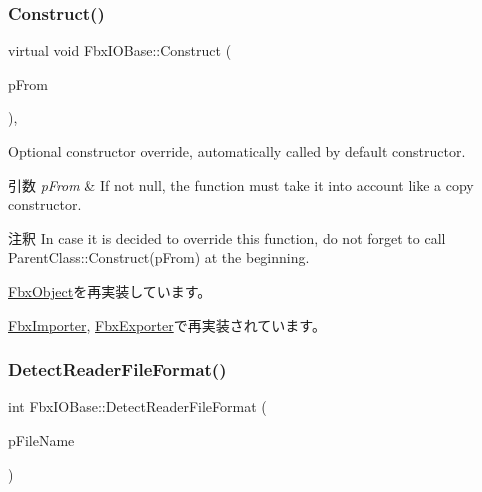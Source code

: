 \subsubsection{\texorpdfstring{Construct()}{Construct()}}
{\footnotesize\ttfamily virtual void Fbx\+I\+O\+Base\+::\+Construct (\begin{DoxyParamCaption}\item[{const \hyperlink{class_fbx_object}{Fbx\+Object} $\ast$}]{p\+From }\end{DoxyParamCaption})\hspace{0.3cm}{\ttfamily [protected]}, {\ttfamily [virtual]}}

Optional constructor override, automatically called by default constructor. 
\begin{DoxyParams}{引数}
{\em p\+From} & If not null, the function must take it into account like a copy constructor. \\
\hline
\end{DoxyParams}
\begin{DoxyRemark}{注釈}
In case it is decided to override this function, do not forget to call Parent\+Class\+::\+Construct(p\+From) at the beginning. 
\end{DoxyRemark}


\hyperlink{class_fbx_object_a313503bc645af3fdceb4a99ef5cea7eb}{Fbx\+Object}を再実装しています。



\hyperlink{class_fbx_importer_ada4dcdb8770ebe90bacd9adcb3f562c0}{Fbx\+Importer}, \hyperlink{class_fbx_exporter_aa308b9a9901e8c98d0b54f0bd20daad2}{Fbx\+Exporter}で再実装されています。

\mbox{\label{class_fbx_i_o_base_aeeed7fece0297ede49ba8ceda58b2743}} 
\subsubsection{\texorpdfstring{Detect\+Reader\+File\+Format()}{DetectReaderFileFormat()}}
{\footnotesize\ttfamily int Fbx\+I\+O\+Base\+::\+Detect\+Reader\+File\+Format (\begin{DoxyParamCaption}\item[{const char $\ast$}]{p\+File\+Name }\end{DoxyParamCaption})\hspace{0.3cm}{\ttfamily [protected]}}

